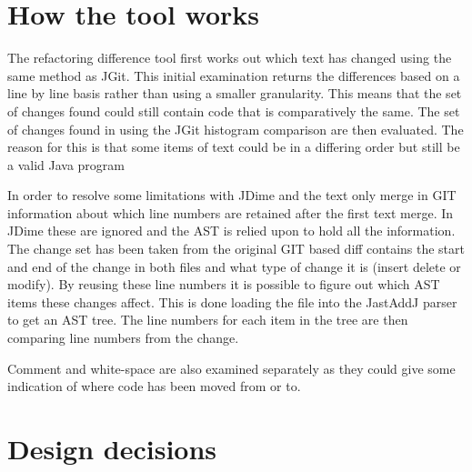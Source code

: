 \section{How the tool works}

The refactoring difference tool first works out which text has changed using the same method as JGit.
This initial examination returns the differences based on a line by line basis rather than using a smaller granularity.
This means that the set of changes found could still contain code that is comparatively the same.
The set of changes found in using the JGit histogram comparison are then evaluated.
The reason for this is that some items of text could be in a differing order but still be a valid Java program


In order to resolve some limitations with JDime and the text only merge in GIT information about which line numbers are retained after the first text merge.  In JDime these are ignored and the AST is relied upon to hold all the information.  The change set has been taken from the original GIT based diff contains the start and end of the change in both files and what type of change it is (insert delete or modify).  By reusing these line numbers it is possible to figure out which AST items these changes affect. This is done loading the file into the JastAddJ parser to get an AST tree. The line numbers for each item in the tree are then comparing line numbers from the change.



Comment and white-space are also examined separately as they could give some indication of where code has been moved from or to.



% 

\section{Design decisions}


